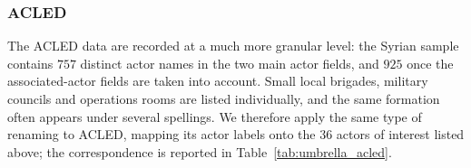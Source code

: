 \subsubsection*{ACLED}

The ACLED data are recorded at a much more granular level: the Syrian sample
contains $757$ distinct actor names in the two main actor fields, and $925$ once
the associated-actor fields are taken into account. Small local brigades,
military councils and operations rooms are listed individually, and the same
formation often appears under several spellings. We therefore apply the same
type of renaming to ACLED, mapping its actor labels onto the $36$ actors of
interest listed above; the correspondence is reported in
Table~\ref{tab:umbrella_acled}.


